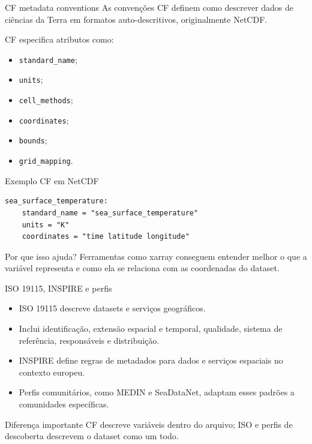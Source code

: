 \documentclass[aspectratio=169]{beamer}
\begin{document}
\begin{frame}{CF metadata conventions}
\Large
As convenções CF definem como descrever dados de ciências da Terra em formatos auto-descritivos, originalmente NetCDF.

\vspace{0.4cm}

CF especifica atributos como:

\begin{itemize}
  \item \texttt{standard\_name};
  \item \texttt{units};
  \item \texttt{cell\_methods};
  \item \texttt{coordinates};
  \item \texttt{bounds};
  \item \texttt{grid\_mapping}.
\end{itemize}
\end{frame}

\begin{frame}[fragile]{Exemplo CF em NetCDF}
\begin{lstlisting}[language={}]
sea_surface_temperature:
    standard_name = "sea_surface_temperature"
    units = "K"
    coordinates = "time latitude longitude"
\end{lstlisting}

\vspace{0.4cm}

\begin{block}{Por que isso ajuda?}
Ferramentas como xarray conseguem entender melhor o que a variável representa e como ela se relaciona com as coordenadas do dataset.
\end{block}
\end{frame}

\begin{frame}{ISO 19115, INSPIRE e perfis}
\begin{itemize}
  \item ISO 19115 descreve datasets e serviços geográficos.
  \item Inclui identificação, extensão espacial e temporal, qualidade, sistema de referência, responsáveis e distribuição.
  \item INSPIRE define regras de metadados para dados e serviços espaciais no contexto europeu.
  \item Perfis comunitários, como MEDIN e SeaDataNet, adaptam esses padrões a comunidades específicas.
\end{itemize}

\vspace{0.4cm}

\begin{block}{Diferença importante}
CF descreve variáveis dentro do arquivo; ISO e perfis de descoberta descrevem o dataset como um todo.
\end{block}
\end{frame}
\end{document}
